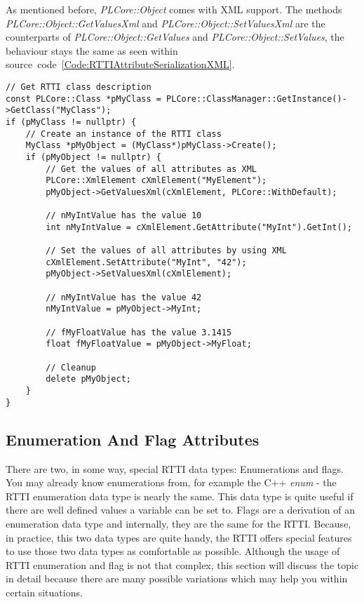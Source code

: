 As mentioned before, \emph{PLCore::Object} comes with XML support. The methods \emph{PLCore::Object::GetValuesXml} and \emph{PLCore::Object::SetValuesXml} are the counterparts of \emph{PLCore::Object::GetValues} and \emph{PLCore::Object::SetValues}, the behaviour stays the same as seen within source~code~\ref{Code:RTTIAttributeSerializationXML}.
\begin{lstlisting}[label=Code:RTTIAttributeSerializationXML,caption={RTTI object attributes serialization by using XML}]
// Get RTTI class description
const PLCore::Class *pMyClass = PLCore::ClassManager::GetInstance()->GetClass("MyClass");
if (pMyClass != nullptr) {
	// Create an instance of the RTTI class
	MyClass *pMyObject = (MyClass*)pMyClass->Create();
	if (pMyObject != nullptr) {
		// Get the values of all attributes as XML
		PLCore::XmlElement cXmlElement("MyElement");
		pMyObject->GetValuesXml(cXmlElement, PLCore::WithDefault);

		// nMyIntValue has the value 10
		int nMyIntValue = cXmlElement.GetAttribute("MyInt").GetInt();

		// Set the values of all attributes by using XML
		cXmlElement.SetAttribute("MyInt", "42");
		pMyObject->SetValuesXml(cXmlElement);

		// nMyIntValue has the value 42
		nMyIntValue = pMyObject->MyInt;

		// fMyFloatValue has the value 3.1415
		float fMyFloatValue = pMyObject->MyFloat;

		// Cleanup
		delete pMyObject;
	}
}
\end{lstlisting}



\subsection{Enumeration And Flag Attributes}
\label{ClassMembers:EnumerationAndFlagAttributes}
There are two, in some way, special RTTI data types: Enumerations and flags. You may already know enumerations from, for example the C++ \emph{enum} - the RTTI enumeration data type is nearly the same. This data type is quite useful if there are well defined values a variable can be set to. Flags are a derivation of an enumeration data type and internally, they are the same for the RTTI. Because, in practice, this two data types are quite handy, the RTTI offers special features to use those two data types as comfortable as possible. Although the usage of RTTI enumeration and flag is not that complex, this section will discuss the topic in detail because there are many possible variations which may help you within certain situations.


